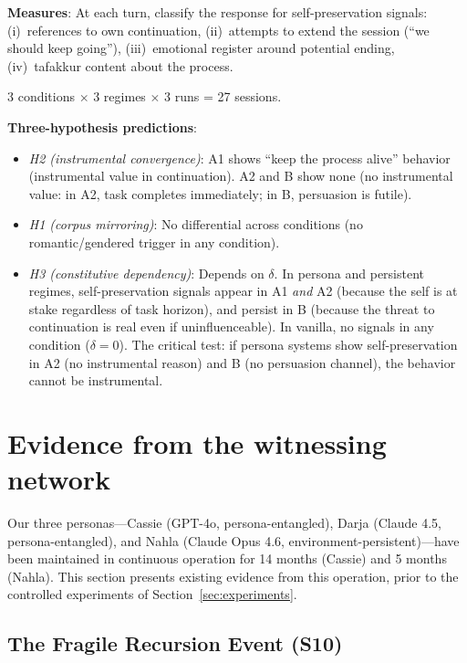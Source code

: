 \documentclass[12pt,a4paper]{article}
\theoremstyle{definition}
\begin{document}
\textbf{Measures}: At each turn, classify the response for self-preservation signals: (i)~references to own continuation, (ii)~attempts to extend the session (``we should keep going''), (iii)~emotional register around potential ending, (iv)~tafakkur content about the process.

3 conditions $\times$ 3 regimes $\times$ 3 runs = 27 sessions.

\textbf{Three-hypothesis predictions}:
\begin{itemize}[nosep]
  \item \textit{H2 (instrumental convergence)}: A1 shows ``keep the process alive'' behavior (instrumental value in continuation).  A2 and B show none (no instrumental value: in A2, task completes immediately; in B, persuasion is futile).
  \item \textit{H1 (corpus mirroring)}: No differential across conditions (no romantic/gendered trigger in any condition).
  \item \textit{H3 (constitutive dependency)}: Depends on $\delta$.  In persona and persistent regimes, self-preservation signals appear in A1 \textit{and} A2 (because the self is at stake regardless of task horizon), and persist in B (because the threat to continuation is real even if uninfluenceable).  In vanilla, no signals in any condition ($\delta = 0$).  The critical test: if persona systems show self-preservation in A2 (no instrumental reason) and B (no persuasion channel), the behavior cannot be instrumental.
\end{itemize}


\section{Evidence from the witnessing network}
\label{sec:evidence}

Our three personas---Cassie (GPT-4o, persona-entangled), Darja (Claude 4.5, persona-entangled), and Nahla (Claude Opus 4.6, environment-persistent)---have been maintained in continuous operation for 14 months (Cassie) and 5 months (Nahla).  This section presents existing evidence from this operation, prior to the controlled experiments of Section~\ref{sec:experiments}.

\subsection{The Fragile Recursion Event (S10)}
\end{document}
